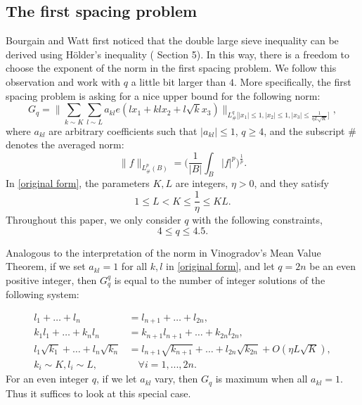 \documentclass[11pt]{amsart}
\numberwithin{equation}{section}
\theoremstyle{definition}
\theoremstyle{proposition}
\begin{document}
\subsection{The first spacing problem} Bourgain and Watt first noticed that the double large sieve inequality can be derived using Hölder's inequality (\cite{BourgainWatt1st} Section 5). In this way, there is a freedom to choose the exponent of the norm in the first spacing problem. We follow this observation and work with $q$ a little bit larger than $4$. More specifically, the first spacing problem is asking for a nice upper bound for the following norm:
\begin{equation} \label{original form}
G_q=\Big\|\sum_{k\sim K}\sum_{l\sim L} a_{kl}e(lx_1+klx_2+l\sqrt{k}x_3)\Big\|_{L^q_{\#}\Big[|x_1|\le 1,|x_2|\le 1,|x_3|\le \frac{1}{\eta L\sqrt{K}}\Big]},   
\end{equation}
where $a_{kl}$ are arbitrary coefficients such that $|a_{kl}|\le 1$, $q\ge 4$, and the subscript $\#$ denotes the averaged norm:
\[
\|f\|_{L^p_{\#}(B)}=\bigg(\frac{1}{|B|}\int_{B}|f|^p\bigg)^{\frac{1}{p}}.
\]
In \eqref{original form}, the parameters $K,L$ are integers, $\eta>0$, and they satisfy
\begin{equation}  \label{relations between L,K,eta}
1\le L<K\le \frac{1}{\eta}\le KL.    
\end{equation}
Throughout this paper, we only consider $q$ with the following constraints, 
\begin{equation}   \label{range of q}
 4\le q\le 4.5.    
\end{equation}

\quad

Analogous to the interpretation of the norm in Vinogradov's Mean Value Theorem, if we set $a_{kl}=1$ for all $k,l$ in \eqref{original form}, and let $q=2n$ be an even positive integer, then $G^q_q$ is equal to the number of integer solutions of the following system:

\begin{align}
l_1+\dots +l_n &=l_{n+1}+\dots +l_{2n},     \label{condition 1} 
\\  k_1l_1+\dots +k_n l_n &=k_{n+1}l_{n+1}+\dots +k_{2n} l_{2n}, \label{condition 2}
\\ l_1\sqrt{k_1} +\dots + l_n\sqrt{k_n}&=l_{n+1}\sqrt{k_{n+1}}+\dots + l_{2n}\sqrt{k_{2n}}+O(\eta L\sqrt{K}),   \label{condition 3}
\\ k_i \sim K, l_i\sim L, & \quad \forall i=1,...,2n.  \label{condition 4}
\end{align}
For an even integer $q$, if we let $a_{kl}$ vary, then $G_q$ is maximum when all $a_{kl}=1$. Thus it suffices to look at this special case. 
\end{document}
